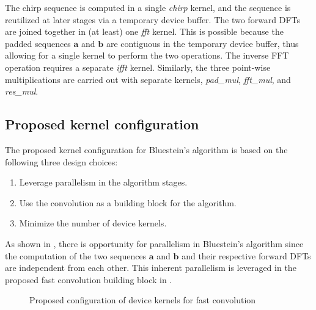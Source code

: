 \documentclass[11pt]{scrartcl}
\begin{document}
The chirp sequence is computed in a single \emph{chirp} kernel, and the sequence is reutilized at later stages via a temporary device buffer. The two forward DFTs are joined together in (at least) one \emph{fft} kernel. This is possible because the padded sequences $\mathbf{a}$ and $\mathbf{b}$ are contiguous in the temporary device buffer, thus allowing for a single kernel to perform the two operations. The inverse FFT operation requires a separate \emph{ifft} kernel. Similarly, the three point-wise multiplications are carried out with separate kernels, \emph{pad\_mul}, \emph{fft\_mul}, and \emph{res\_mul}.

\subsection{Proposed kernel configuration}
The proposed kernel configuration for Bluestein's algorithm is based on the following three design choices:
\begin{enumerate}
\item Leverage parallelism in the algorithm stages.
\item Use the convolution as a building block for the algorithm.
\item Minimize the number of device kernels.
\end{enumerate}

As shown in , there is opportunity for parallelism in Bluestein's algorithm since the computation of the two sequences $\mathbf{a}$ and $\mathbf{b}$ and their respective forward DFTs are independent from each other. This inherent parallelism is leveraged in the proposed fast convolution building block in .

\begin{figure}[H]
\centering
{}
\caption{Proposed configuration of device kernels for fast convolution}
\label{fig:kernel_configuration_convolution_proposed}
\end{figure}
\end{document}
